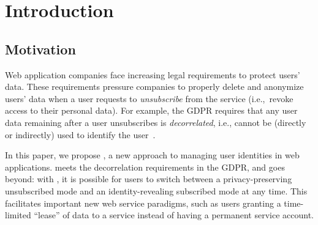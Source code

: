 \section{Introduction}

\subsection{Motivation} 

Web application companies face increasing legal requirements to protect users’ data. These
requirements pressure companies to properly delete and anonymize users' data when a user requests to
\emph{unsubscribe} from the service (i.e.,\ revoke access to their personal data).
For example, the GDPR requires that any user data remaining after a user unsubscribes is
\emph{decorrelated}, i.e., cannot be (directly or indirectly) used to identify the user~\cite{gdpr}.  

In this paper, we propose \sys, a new approach to managing user identities in web applications.
\sys{} meets the decorrelation requirements in the GDPR, and goes beyond: with \sys, it is possible
for users to switch between a privacy-preserving unsubscribed mode and an identity-revealing
subscribed mode at any time. This facilitates important new web service paradigms, such as users
granting a time-limited ``lease'' of data to a service instead of having a permanent service account.


